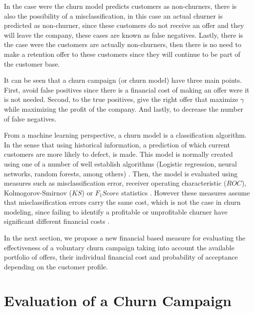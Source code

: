 In the case were the churn model predicts customers as non-churners, there is also the possibility 
of a misclassification, in this case an actual churner is predicted as non-churner, since 
these customers do not receive an offer and they will leave the company, these cases are known as 
false negatives. Lastly, there is the case were the customers are actually non-churners, then 
there is no need to make a retention offer to these customers since they will continue to be part 
of the customer base.

It can be seen that a churn campaign (or churn model) have three main points. First, avoid false 
positives since there is a financial cost of making an offer were it is not needed. Second, to the 
true positives, give the right offer that maximize $\gamma$ while maximizing the profit of the 
company. And lastly, to decrease the number of false negatives.

	From a machine learning perspective, a churn model is a classification algorithm.
	In the sense that using historical information, a prediction of which current customers 
	are more likely to defect, is made. This model is normally created using one of a number of 
	well establish algorithms (Logistic regression, neural networks, random forests, among 
	others) \citep{Ngai2009,KhakAbi2010}. Then, the model is evaluated using measures such as 
	misclassification error, receiver operating characteristic ($ROC$),  Kolmogorov-Smirnov ($KS$) 
	or \mbox{$F_1Score$} statistics \citep{Verbeke2012}. However these measures assume that 
misclassification errors     carry the same cost, which is not the case in churn modeling, since 
failing to identify a profitable or unprofitable churner have significant different financial costs
\citep{Glady2009}. 
	
	In the next section, we propose a new financial based measure for evaluating the effectiveness of 
a 	voluntary churn campaign taking into account the available portfolio of offers, their 
individual 	financial cost and probability of acceptance depending on the customer profile. 

\section{Evaluation of a Churn Campaign}
	
